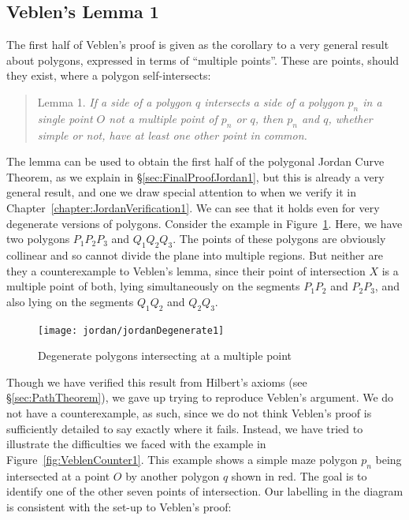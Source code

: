 \subsection{Veblen's Lemma 1}\label{sec:VeblenLemma1}
The first half of Veblen's proof is given as the corollary to a very general result about polygons, expressed in terms of ``multiple points''. These are points, should they exist, where a polygon self-intersects:
\begin{quote}
Lemma 1. \emph{If a side of a polygon $q$ intersects a side of a polygon $p_n$ in a single point $O$ not a multiple point of $p_n$ or $q$, then $p_n$ and $q$, whether simple or not, have at least one other point in common.} 
\end{quote}

The lemma can be used to obtain the first half of the polygonal Jordan Curve Theorem, as we explain in \S\ref{sec:FinalProofJordan1}, but this is already a very general result, and one we draw special attention to when we verify it in Chapter~\ref{chapter:JordanVerification1}. We can see that it holds even for very degenerate versions of polygons. Consider the example in Figure~\ref{fig:jordanDegenerate1}. Here, we have two polygons $P_1P_2P_3$ and $Q_1Q_2Q_3$. The points of these polygons are obviously collinear and so cannot divide the plane into multiple regions. But neither are they a counterexample to Veblen's lemma, since their point of intersection $X$ is a multiple point of both, lying simultaneously on the segments $P_1P_2$ and $P_2P_3$, and also lying on the segments $Q_1Q_2$ and $Q_2Q_3$.

\begin{figure}
\centering
\texttt{[image: jordan/jordanDegenerate1]}
\caption{Degenerate polygons intersecting at a multiple point}
\label{fig:jordanDegenerate1}
\end{figure}

Though we have verified this result from Hilbert's axioms (see \S\ref{sec:PathTheorem}), we gave up trying to reproduce Veblen's argument. We do not have a counterexample, as such, since we do not think Veblen's proof is sufficiently detailed to say exactly where it fails. Instead, we have tried to illustrate the difficulties we faced with the example in Figure~\ref{fig:VeblenCounter1}. This example shows a simple maze polygon $p_n$ being intersected at a point $O$ by another polygon $q$ shown in red. The goal is to identify one of the other seven points of intersection. Our labelling in the diagram is consistent with the set-up to Veblen's proof:

